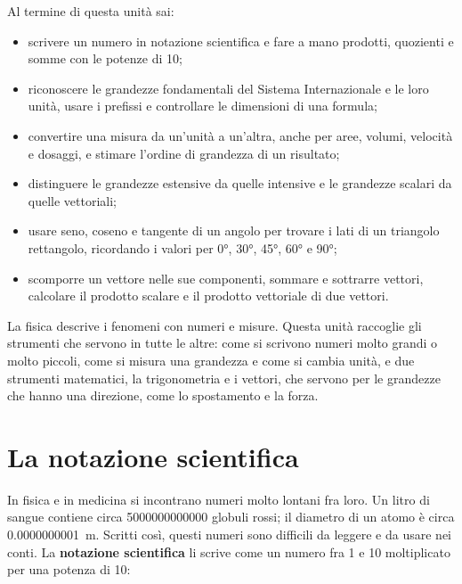 \dispensa

\begin{tcolorbox}[fisbox={formula}{formulaBg},title={Obiettivi dell'unità}]
Al termine di questa unità sai:
\begin{itemize}
  \item scrivere un numero in notazione scientifica e fare a mano prodotti, quozienti e somme con le potenze di 10;
  \item riconoscere le grandezze fondamentali del Sistema Internazionale e le loro unità, usare i prefissi e controllare le dimensioni di una formula;
  \item convertire una misura da un'unità a un'altra, anche per aree, volumi, velocità e dosaggi, e stimare l'ordine di grandezza di un risultato;
  \item distinguere le grandezze estensive da quelle intensive e le grandezze scalari da quelle vettoriali;
  \item usare seno, coseno e tangente di un angolo per trovare i lati di un triangolo rettangolo, ricordando i valori per \ang{0}, \ang{30}, \ang{45}, \ang{60} e \ang{90};
  \item scomporre un vettore nelle sue componenti, sommare e sottrarre vettori, calcolare il prodotto scalare e il prodotto vettoriale di due vettori.
\end{itemize}
\end{tcolorbox}

La fisica descrive i fenomeni con numeri e misure. Questa unità raccoglie gli strumenti che servono in tutte le altre: come si scrivono numeri molto grandi o molto piccoli, come si misura una grandezza e come si cambia unità, e due strumenti matematici, la trigonometria e i vettori, che servono per le grandezze che hanno una direzione, come lo spostamento e la forza.

\section{La notazione scientifica}
\label{sec:ud1-notazione}

In fisica e in medicina si incontrano numeri molto lontani fra loro. Un litro di sangue contiene circa \num{5000000000000} globuli rossi; il diametro di un atomo è circa \SI{0,0000000001}{\metre}. Scritti così, questi numeri sono difficili da leggere e da usare nei conti. La \textbf{notazione scientifica} li scrive come un numero fra 1 e 10 moltiplicato per una potenza di 10:

